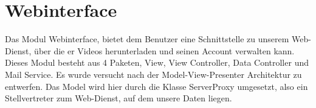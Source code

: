 \section{Webinterface}
Das Modul Webinterface, bietet dem Benutzer eine Schnittstelle zu unserem Web-Dienst, über die er Videos herunterladen und seinen Account verwalten kann. Dieses Modul besteht aus 4 Paketen, View, View Controller, Data Controller und Mail Service. Es wurde versucht nach der Model-View-Presenter Architektur zu entwerfen. Das Model wird hier durch die Klasse ServerProxy umgesetzt, also ein Stellvertreter zum Web-Dienst, auf dem unsere Daten liegen.
\newpage

\newpage

%
